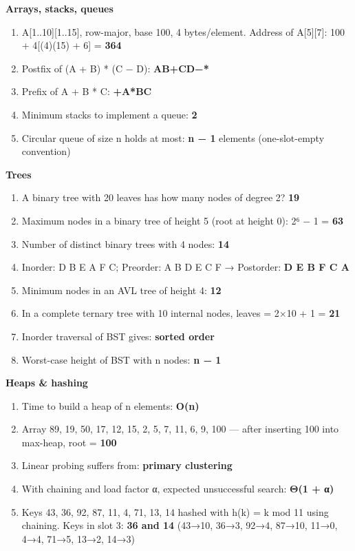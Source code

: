 \textbf{Arrays, stacks, queues}

\begin{enumerate}
\def\labelenumi{\arabic{enumi}.}
\setcounter{enumi}{7}
\tightlist
\item
  A{[}1..10{]}{[}1..15{]}, row-major, base 100, 4 bytes/element. Address of A{[}5{]}{[}7{]}: 100 + 4{[}(4)(15) + 6{]} = \textbf{364}
\item
  Postfix of (A + B) * (C − D): \textbf{AB+CD−*}
\item
  Prefix of A + B * C: \textbf{+A*BC}
\item
  Minimum stacks to implement a queue: \textbf{2}
\item
  Circular queue of size n holds at most: \textbf{n − 1} elements (one-slot-empty convention)
\end{enumerate}

\textbf{Trees}

\begin{enumerate}
\def\labelenumi{\arabic{enumi}.}
\setcounter{enumi}{12}
\tightlist
\item
  A binary tree with 20 leaves has how many nodes of degree 2? \textbf{19}
\item
  Maximum nodes in a binary tree of height 5 (root at height 0): 2⁶ − 1 = \textbf{63}
\item
  Number of distinct binary trees with 4 nodes: \textbf{14}
\item
  Inorder: D B E A F C; Preorder: A B D E C F → Postorder: \textbf{D E B F C A}
\item
  Minimum nodes in an AVL tree of height 4: \textbf{12}
\item
  In a complete ternary tree with 10 internal nodes, leaves = 2×10 + 1 = \textbf{21}
\item
  Inorder traversal of BST gives: \textbf{sorted order}
\item
  Worst-case height of BST with n nodes: \textbf{n − 1}
\end{enumerate}

\textbf{Heaps \& hashing}

\begin{enumerate}
\def\labelenumi{\arabic{enumi}.}
\setcounter{enumi}{20}
\tightlist
\item
  Time to build a heap of n elements: \textbf{O(n)}
\item
  Array 89, 19, 50, 17, 12, 15, 2, 5, 7, 11, 6, 9, 100 --- after inserting 100 into max-heap, root = \textbf{100}
\item
  Linear probing suffers from: \textbf{primary clustering}
\item
  With chaining and load factor α, expected unsuccessful search: \textbf{Θ(1 + α)}
\item
  Keys 43, 36, 92, 87, 11, 4, 71, 13, 14 hashed with h(k) = k mod 11 using chaining. Keys in slot 3: \textbf{36 and 14} (43→10, 36→3, 92→4, 87→10, 11→0, 4→4, 71→5, 13→2, 14→3)
\end{enumerate}

